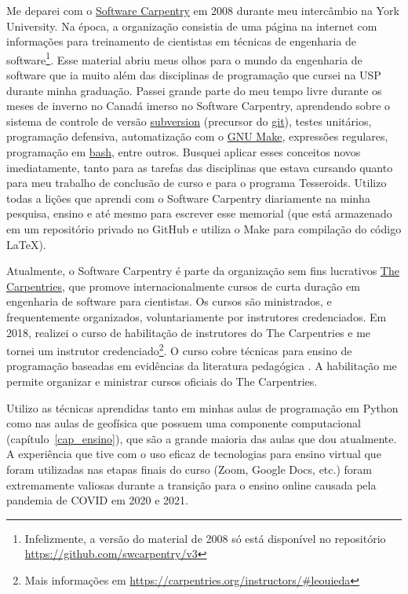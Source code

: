 \documentclass[12pt,a4paper,oneside]{book}
\begin{document}
Me deparei com o \href{https://software-carpentry.org/}{Software Carpentry}
em 2008 durante meu intercâmbio na York University.
Na época, a organização consistia de uma página na internet com informações
para treinamento de cientistas em técnicas de engenharia de
software\footnote{Infelizmente, a versão do material de 2008 só está disponível
no repositório \url{https://github.com/swcarpentry/v3}}.
Esse material abriu meus olhos para o mundo da engenharia de software que ia
muito além das disciplinas de programação que cursei na USP durante minha
graduação.
Passei grande parte do meu tempo livre durante os meses de inverno no Canadá
imerso no Software Carpentry, aprendendo sobre o sistema de controle de versão
\href{https://subversion.apache.org/}{subversion} (precursor do
\href{https://git-scm.com/}{git}), testes unitários, programação defensiva,
automatização com o \href{https://www.gnu.org/software/make/}{GNU Make},
expressões regulares, programação em
\href{https://www.gnu.org/software/bash/}{bash}, entre outros.
Busquei aplicar esses conceitos novos imediatamente, tanto para as tarefas das
disciplinas que estava cursando quanto para meu trabalho de conclusão de curso
e para o programa Tesseroids.
Utilizo todas a lições que aprendi com o Software Carpentry diariamente na
minha pesquisa, ensino e até mesmo para escrever esse memorial (que está
armazenado em um repositório privado no GitHub e utiliza o Make para compilação
do código \LaTeX{}).

Atualmente, o Software Carpentry é parte da organização sem fins lucrativos
\href{https://carpentries.org/}{The Carpentries}, que promove
internacionalmente cursos de curta duração em engenharia de software para
cientistas.
Os cursos são ministrados, e frequentemente organizados, voluntariamente por
instrutores credenciados.
Em 2018, realizei o curso de habilitação de instrutores do The Carpentries e me
tornei um instrutor
credenciado\footnote{Mais informações em \url{https://carpentries.org/instructors/\#leouieda}}.
O curso cobre técnicas para ensino de programação baseadas em evidências da
literatura pedagógica \citep[resumidas em][]{Brown2018}.
A habilitação me permite organizar e ministrar cursos oficiais do The
Carpentries.

Utilizo as técnicas aprendidas tanto em minhas aulas de programação em Python
como nas aulas de geofísica que possuem uma componente computacional
(capítulo~\ref{cap_ensino}), que são a grande maioria das aulas que dou
atualmente.
A experiência que tive com o uso eficaz de tecnologias para ensino virtual que
foram utilizadas nas etapas finais do curso (Zoom, Google Docs, etc.) foram
extremamente valiosas durante a transição para o ensino online causada pela
pandemia de COVID em 2020 e 2021.
\end{document}
